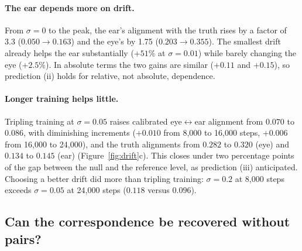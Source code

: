 \documentclass[11pt]{article}
\newcommand{\lr}{\ensuremath{\leftrightarrow}}
\begin{document}
\paragraph{The ear depends more on drift.} From $\sigma=0$ to the peak, the ear's alignment with the truth rises by a factor of 3.3 ($0.050\to0.163$) and the eye's by 1.75 ($0.203\to0.355$). The smallest drift already helps the ear substantially ($+51\%$ at $\sigma=0.01$) while barely changing the eye ($+2.5\%$). In absolute terms the two gains are similar ($+0.11$ and $+0.15$), so prediction (ii) holds for relative, not absolute, dependence.

\paragraph{Longer training helps little.} Tripling training at $\sigma=0.05$ raises calibrated eye\lr{}ear alignment from $0.070$ to $0.086$, with diminishing increments ($+0.010$ from 8{,}000 to 16{,}000 steps, $+0.006$ from 16{,}000 to 24{,}000), and the truth alignments from $0.282$ to $0.320$ (eye) and $0.134$ to $0.145$ (ear) (Figure~\ref{fig:drift}c). This closes under two percentage points of the gap between the null and the reference level, as prediction (iii) anticipated. Choosing a better drift did more than tripling training: $\sigma=0.2$ at 8{,}000 steps exceeds $\sigma=0.05$ at 24{,}000 steps ($0.118$ versus $0.096$).

\subsection{Can the correspondence be recovered without pairs?}
\label{sec:unpaired}
\end{document}
